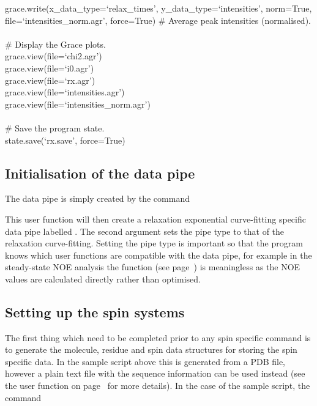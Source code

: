 \begin{exampleenv}
grace.write(x\_data\_type=`relax\_times', y\_data\_type=`intensities', norm=True, file=`intensities\_norm.agr', force=True)    \# Average peak intensities (normalised). \\
 \\
\# Display the Grace plots. \\
grace.view(file=`chi2.agr') \\
grace.view(file=`i0.agr') \\
grace.view(file=`rx.agr') \\
grace.view(file=`intensities.agr') \\
grace.view(file=`intensities\_norm.agr') \\
 \\
\# Save the program state. \\
state.save(`rx.save', force=True)
\end{exampleenv}




\subsection{Initialisation of the data pipe} \label{Rx initialisation}

The data pipe is simply created by the command


This user function will then create a relaxation exponential curve-fitting specific data pipe labelled .  The second argument sets the pipe type to that of the relaxation curve-fitting.  Setting the pipe type is important so that the program knows which user functions are compatible with the data pipe, for example in the steady-state NOE analysis the function  (see page~\pageref{uf: minimise}) is meaningless as the NOE values are calculated directly rather than optimised.



\subsection{Setting up the spin systems}

The first thing which need to be completed prior to any spin specific command is to generate the molecule, residue and spin data structures for storing the spin specific data.  In the sample script above this is generated from a PDB file, however a plain text file with the sequence information can be used instead (see the  user function on page~\pageref{uf: sequence.read} for more details).  In the case of the sample script, the command

